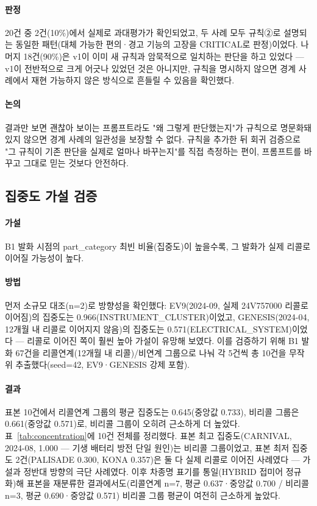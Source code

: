 \documentclass[11pt]{article}
\begin{document}
\paragraph{판정} 20건 중 2건(10\%)에서 실제로 과대평가가 확인되었고, 두 사례 모두 규칙②로 설명되는 동일한 패턴(대체 가능한 편의·경고 기능의 고장을 CRITICAL로 판정)이었다. 나머지 18건(90\%)은 v1이 이미 새 규칙과 암묵적으로 일치하는 판단을 하고 있었다 — v1이 전반적으로 크게 어긋나 있었던 것은 아니지만, 규칙을 명시하지 않으면 경계 사례에서 재현 가능하지 않은 방식으로 흔들릴 수 있음을 확인했다.

\paragraph{논의} 결과만 보면 괜찮아 보이는 프롬프트라도 "왜 그렇게 판단했는지"가 규칙으로 명문화돼 있지 않으면 경계 사례의 일관성을 보장할 수 없다. 규칙을 추가한 뒤 회귀 검증으로 "그 규칙이 기존 판단을 실제로 얼마나 바꾸는지"를 직접 측정하는 편이, 프롬프트를 바꾸고 그대로 믿는 것보다 안전하다.

\subsection{집중도 가설 검증}

\paragraph{가설} B1 발화 시점의 part\_category 최빈 비율(집중도)이 높을수록, 그 발화가 실제 리콜로 이어질 가능성이 높다.

\paragraph{방법} 먼저 소규모 대조(n=2)로 방향성을 확인했다: EV9(2024-09, 실제 24V757000 리콜로 이어짐)의 집중도는 0.966(INSTRUMENT\_CLUSTER)이었고, GENESIS(2024-04, 12개월 내 리콜로 이어지지 않음)의 집중도는 0.571(ELECTRICAL\_SYSTEM)이었다 — 리콜로 이어진 쪽이 훨씬 높아 가설이 유망해 보였다. 이를 검증하기 위해 B1 발화 67건을 리콜연계(12개월 내 리콜)/비연계 그룹으로 나눠 각 5건씩 총 10건을 무작위 추출했다(seed=42, EV9·GENESIS 강제 포함).

\paragraph{결과} 표본 10건에서 리콜연계 그룹의 평균 집중도는 0.645(중앙값 0.733), 비리콜 그룹은 0.661(중앙값 0.571)로, 비리콜 그룹이 오히려 근소하게 더 높았다.
표~\ref{tab:concentration}에 10건 전체를 정리했다. 표본 최고 집중도(CARNIVAL, 2024-08, 1.000 — 기생 배터리 방전 단일 원인)는 비리콜 그룹이었고, 표본 최저 집중도 2건(PALISADE 0.300, KONA 0.357)은 둘 다 실제 리콜로 이어진 사례였다 — 가설과 정반대 방향의 극단 사례였다. 이후 차종명 표기를 통일(HYBRID 접미어 정규화)해 표본을 재분류한 결과에서도(리콜연계 n=7, 평균 0.637·중앙값 0.700 / 비리콜 n=3, 평균 0.690·중앙값 0.571) 비리콜 그룹 평균이 여전히 근소하게 높았다.
\end{document}
